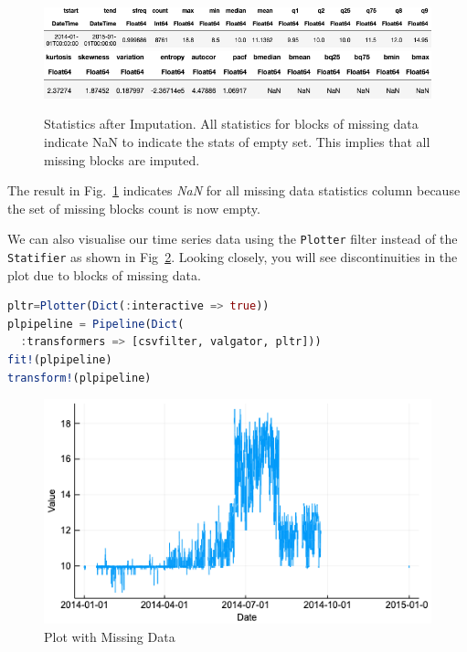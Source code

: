 \documentclass{juliacon}
\begin{document}
\begin{figure}[htbp]
   \centering
   \includegraphics[width=\columnwidth]{imputed1.png} %
   \vskip 2pt
      \includegraphics[width=\columnwidth]{imputed2.png} %
   \caption{Statistics after Imputation. All statistics for blocks of missing data indicate NaN to indicate the stats of empty set. This implies that all missing blocks are imputed.}
   \label{fig:imputation}
\end{figure}

The result in Fig.~\ref{fig:imputation} indicates \emph{NaN} for all missing data statistics column because the set 
of missing blocks count is now empty.

\vskip 6pt

We can also visualise our time series data using the \texttt{Plotter} filter instead of the \texttt{Statifier} as shown in Fig~\ref{fig:mplot}. Looking closely, you will see discontinuities in the plot due to blocks of missing data.

\begin{lstlisting}[language = Julia]
pltr=Plotter(Dict(:interactive => true))
plpipeline = Pipeline(Dict(
  :transformers => [csvfilter, valgator, pltr]))
fit!(plpipeline)
transform!(plpipeline)
\end{lstlisting}

\begin{figure}[htbp]
   \centering
   \includegraphics[width=\columnwidth]{mplot.png} %
   \caption{Plot with Missing Data}
   \label{fig:mplot}
\end{figure}
\end{document}
